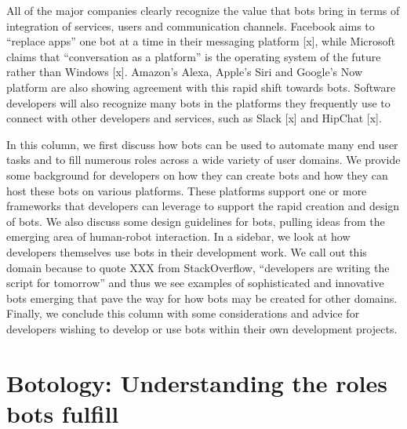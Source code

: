 \documentclass{sig-alternate}
\begin{document}
All of the major companies clearly recognize the value that bots bring in terms of integration of services, users and communication channels. Facebook aims to ``replace apps'' one bot at a time in their messaging platform [x], while Microsoft claims that ``conversation as a platform'' is the operating system of the future rather than Windows [x]. 
Amazon's Alexa, Apple's Siri and Google's Now platform are also showing agreement with this rapid shift towards bots.
Software developers will also recognize many bots in the platforms they frequently use to connect with other developers and services, such as Slack [x] and HipChat [x]. 

In this column, we first discuss how bots can be used to automate many end user tasks and to fill numerous roles across a wide variety of user domains.  
We provide some background for developers on how they can create bots and how they can host these bots on various platforms. These platforms support one or more frameworks that developers can leverage to support the rapid creation and design of bots. We also discuss some design guidelines for bots, pulling ideas from the emerging area of human-robot interaction. 
In a sidebar, we look at how developers themselves use bots in their development work.  We call out this domain because to quote XXX from StackOverflow, ``developers are writing the script for tomorrow'' and thus we see examples of sophisticated and innovative bots emerging that pave the way for how bots may be created for other domains.
Finally, we conclude this column with some considerations and advice for developers wishing to develop or use bots within their own development projects.   


 
	

	
	
%	

\section{Botology: Understanding the roles bots fulfill}
\end{document}
